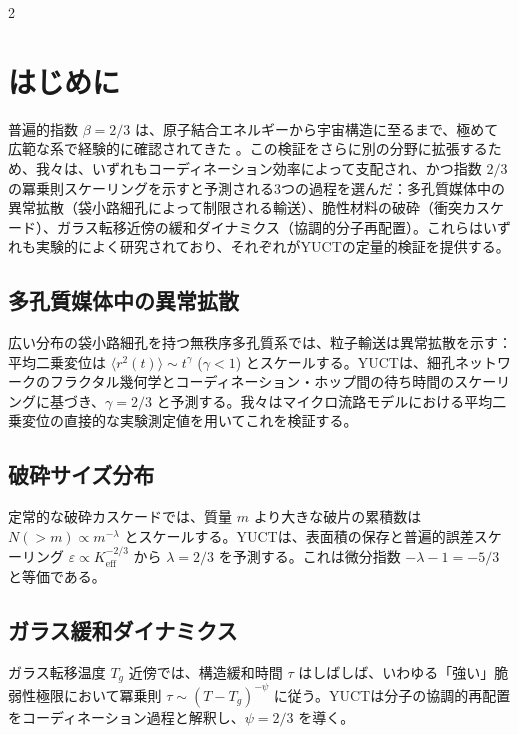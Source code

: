 \documentclass[11pt,a4paper]{article}
\newcommand{\eps}{\varepsilon}
\newcommand{\Keff}{K_{\mathrm{eff}}}
\newcommand{\betaf}{\beta}
\begin{document}
	\vspace{0.4cm}
	\vspace*{-\baselineskip}
	\begin{multicols}{2}
		
		\section{はじめに}
		
		普遍的指数 \(\betaf = 2/3\) は、原子結合エネルギーから宇宙構造に至るまで、極めて広範な系で経験的に確認されてきた \cite{AppendixY, AppendixL, AppendixC, AppendixG}。この検証をさらに別の分野に拡張するため、我々は、いずれもコーディネーション効率によって支配され、かつ指数 \(2/3\) の冪乗則スケーリングを示すと予測される3つの過程を選んだ：多孔質媒体中の異常拡散（袋小路細孔によって制限される輸送）、脆性材料の破砕（衝突カスケード）、ガラス転移近傍の緩和ダイナミクス（協調的分子再配置）。これらはいずれも実験的によく研究されており、それぞれがYUCTの定量的検証を提供する。
		
		\subsection{多孔質媒体中の異常拡散}
		広い分布の袋小路細孔を持つ無秩序多孔質系では、粒子輸送は異常拡散を示す：平均二乗変位は \(\langle r^2(t) \rangle \sim t^{\gamma}\) (\(\gamma < 1\)) とスケールする。YUCTは、細孔ネットワークのフラクタル幾何学とコーディネーション・ホップ間の待ち時間のスケーリングに基づき、\(\gamma = 2/3\) と予測する。我々はマイクロ流路モデルにおける平均二乗変位の直接的な実験測定値を用いてこれを検証する。
		
		\subsection{破砕サイズ分布}
		定常的な破砕カスケードでは、質量 \(m\) より大きな破片の累積数は \(N(>m) \propto m^{-\lambda}\) とスケールする。YUCTは、表面積の保存と普遍的誤差スケーリング \(\eps \propto \Keff^{-2/3}\) から \(\lambda = 2/3\) を予測する。これは微分指数 \(-\lambda - 1 = -5/3\) と等価である。
		
		\subsection{ガラス緩和ダイナミクス}
		ガラス転移温度 \(T_g\) 近傍では、構造緩和時間 \(\tau\) はしばしば、いわゆる「強い」脆弱性極限において冪乗則 \(\tau \sim (T - T_g)^{-\psi}\) に従う。YUCTは分子の協調的再配置をコーディネーション過程と解釈し、\(\psi = 2/3\) を導く。
		

\end{multicols}
\end{document}

